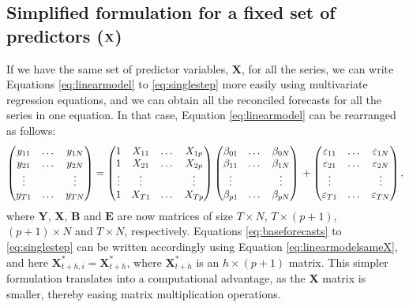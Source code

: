 \documentclass[11pt,a4paper,]{article}
\begin{document}
\hypertarget{simplified-formulation-for-a-fixed-set-of-predictors-bf-x}{%
\subsection{\texorpdfstring{Simplified formulation for a fixed set of predictors (\(\bf {X}\)) \label{sec:proposedapproach2}}{Simplified formulation for a fixed set of predictors (\textbackslash bf \{X\}) }}\label{simplified-formulation-for-a-fixed-set-of-predictors-bf-x}}

If we have the same set of predictor variables, \(\bm{X}\), for all the series, we can write Equations \eqref{eq:linearmodel} to \eqref{eq:singlestep} more easily using multivariate regression equations, and we can obtain all the reconciled forecasts for all the series in one equation. In that case, Equation \eqref{eq:linearmodel} can be rearranged as follows:
\begin{equation}\label{eq:linearmodelsameX}
  \begin{pmatrix}
  y_{11} & \dots & y_{1N}\\
  y_{21} & \dots & y_{2N}\\
  \vdots &       & \vdots\\
  y_{T1} & \dots & y_{TN}
  \end{pmatrix} =
  \begin{pmatrix}
  1      & X_{11} & \dots & X_{1p}\\
  1      & X_{21} & \dots & X_{2p}\\
  \vdots & \vdots &       & \vdots\\
  1      & X_{T1} & \dots & X_{Tp}
  \end{pmatrix}
  \begin{pmatrix}
  \beta_{01} & \dots & \beta_{0N}\\
  \beta_{11} & \dots & \beta_{1N}\\
  \vdots     &       & \vdots\\
  \beta_{p1} & \dots & \beta_{pN}
  \end{pmatrix} \\
  +
  \begin{pmatrix}
  \varepsilon_{11} & \dots & \varepsilon_{1N}\\
  \varepsilon_{21} & \dots & \varepsilon_{2N}\\
  \vdots           &       & \vdots\\
  \varepsilon_{T1} & \dots & \varepsilon_{TN}
  \end{pmatrix},
\end{equation}
where \(\bm{Y}\), \(\bm{X}\), \(\bm{B}\) and \(\bm{E}\) are now matrices of size \(T\times N\), \(T\times (p+1)\), \((p+1)\times N\) and \(T \times N\), respectively. Equations \eqref{eq:baseforecasts} to \eqref{eq:singlestep} can be written accordingly using Equation \eqref{eq:linearmodelsameX}, and here \(\bm{X}^*_{t+h,i} = \bm{X}^*_{t+h}\), where \(\bm{X}^*_{t+h}\) is an \(h\times (p+1)\) matrix. This simpler formulation translates into a computational advantage, as the \(\bm X\) matrix is smaller, thereby easing matrix multiplication operations.
\end{document}
